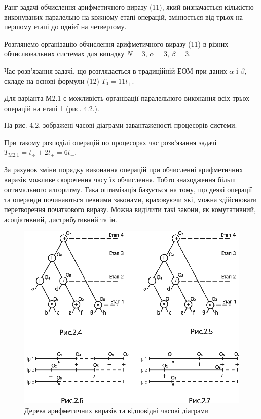 \documentclass[
	a4paper,
	oneside,
	BCOR = 10mm,
	DIV = 12,
	12pt,
	headings = normal,
]{scrartcl}
\begin{document}
		Ранг задачі обчислення арифметичного виразу (11), який визначається кількістю виконуваних паралельно на кожному етапі операцій, змінюється від трьох на першому етапі до однієї на четвертому.

		Розглянемо організацію обчислення арифметичного виразу (11) в різних обчислювальних системах для випадку $N = 3$, $\alpha = 3$, $\beta = 3$.

		Час розв’язання задачі, що розглядається в традиційній ЕОМ при даних $\alpha$ і $\beta$, складе на основі формули (12) $T_0 = 11 t_{+}$.

		Для варіанта М2.1 є можливість організації паралельного виконання всіх трьох операцій на етапі 1 (рис. 4.2.).

		На рис. 4.2. зображені часові діаграми завантаженості процесорів системи. 

		При такому розподілі операцій по процесорах час розв’язання задачі $T_{\text{M2.1}} = t_{\div} + 2 t_{+} = 6 t_{+}$.

		За рахунок зміни порядку виконання операцій при обчисленні арифметичних виразів можливе скорочення часу їх обчислення. Тобто знаходження більш оптимального алгоритму. Така оптимізація базується на тому, що деякі операції та операнди починаються певними законами, враховуючи які, можна здійснювати перетворення початкового виразу. Можна виділити такі закони, як комутативний, асоціативний, дистрибутивний та ін.

		\begin{figure}[!htbp]
			\centering
			\includegraphics[height = 18\baselineskip]{./assets/01.png}
			\caption{Дерева арифметичних виразів та відповідні часові діаграми}
			\label{fig:expr-trees-time-diags}
		\end{figure}
\end{document}
